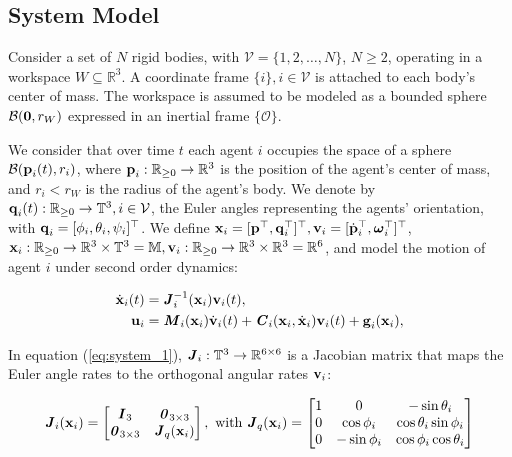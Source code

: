 \subsection{System Model}

Consider a set of $N$ rigid bodies, with $\mathcal{V} = \{ 1,2, \ldots, N\}$,
$N  \geq 2$, operating in a workspace $W\subseteq \mathbb{R}^3$.
A coordinate frame $\{i\}, i\in\mathcal{V}$ is attached to each body's
center of mass. The workspace is assumed to be modeled as a
bounded sphere $\mathcal{B}(\bm{\mathbf{0}},r_W)$ expressed in an inertial frame
$\{\mathcal{O}\}$.

We consider that over time $t$ each agent $i$ occupies the space of a sphere
$\mathcal{B}(\bm{\mathbf{p}}_i(t), r_i)$, where $\bm{\mathbf{p}}_i : \mathbb{R}_{\geq 0} \to \mathbb{R}^3$
is the position of the agent's center of mass, and $r_i < r_W$ is the radius of the
agent's body. We denote by $\bm{\mathbf{q}}_i(t):\mathbb{R}_{\geq 0} \to \mathbb{T}^3, i\in\mathcal{V}$,
the Euler angles representing the agents' orientation,
with $\bm{\mathbf{q}}_i = [\phi_i,\theta_i,\psi_i]^{\top}$.
We define $\bm{\mathbf{x}}_i = [\bm{\mathbf{p}}^{\top},\bm{\mathbf{q}}^{\top}_i]^{\top},
\bm{\mathbf{v}}_i =[\dot{\bm{\mathbf{p}}}^{\top}_i, \bm{\mathbf{\omega}}^{\top}_i]^{\top}$,
$\bm{\mathbf{x}}_i:\mathbb{R}_{\geq 0} \to \mathbb{R}^3\times \mathbb{T}^3 =
\mathbb{M}, \bm{\mathbf{v}}_i : \mathbb{R}_{\geq 0} \to \mathbb{R}^3\times \mathbb{R}^3
= \mathbb{R}^6$, and model the motion of agent $i$ under second order dynamics:

\begin{subequations}
	\begin{align}
    \dot{\bm{\mathbf{x}}}_i(t) &= \bm{\mathit{J}}_i^{-1}(\bm{\mathbf{x}}_i) \bm{\mathbf{v}}_i(t), \label{eq:system_1} \\
    \bm{\mathbf{u}}_i &= \bm{\mathit{M}}_i(\bm{\mathbf{x}}_i) \dot{\bm{\mathbf{v}}}_i(t) + \bm{\mathit{C}}_i(\bm{\mathbf{x}}_i,\dot{\bm{\mathbf{x}}}_i) \bm{\mathbf{v}}_i(t)+\bm{\mathbf{g}}_i(\bm{\mathbf{x}}_i), \label{eq:system_2}
	\end{align}
  \label{eq:system}
\end{subequations}

In equation (\ref{eq:system_1}), $\bm{\mathit{J}}_i:\mathbb{T}^3 \to \mathbb{R}^{6\times6}$ is
a Jacobian matrix that maps the Euler angle rates to the orthogonal angular
rates $\bm{\mathbf{v}}_i$:

\begin{equation}
  \bm{\mathit{J}}_i(\bm{\mathbf{x}}_i) =
  \begin{bmatrix}
    \bm{\mathit{I}}_3 & \bm{\mathit{0}}_{3 \times 3} \\
    \bm{\mathit{0}}_{3 \times 3} & \bm{\mathit{J}}_{ q }(\bm{\mathbf{x}}_i) \\
  \end{bmatrix} \notag, \text{ with }
  \bm{\mathit{J}}_q(\bm{\mathbf{x}}_i) =
  \begin{bmatrix}
    1 & 0 & -\sin\theta_i \\
    0 & \cos\phi_i & \cos\theta_i \sin\phi_i \\
    0 & - \sin\phi_i & \cos\phi_i \cos\theta_i
  \end{bmatrix} \notag
\end{equation}

